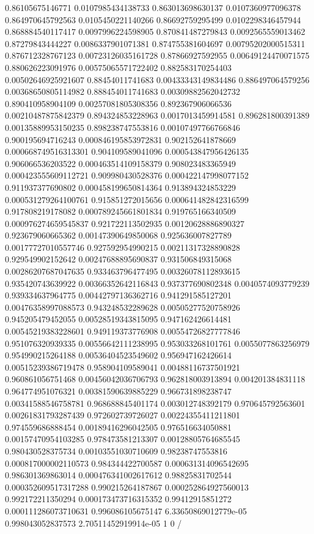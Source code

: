 \begin{table}
\begin{tabu}
\begin{sparkline}{10}
0.86105675146771 0.0107985434138733 0.863013698630137 0.0107360977096378 0.864970645792563 0.0105450221140266 0.86692759295499 0.0102298346457944 0.868884540117417 0.0097996224598905 0.870841487279843 0.0092565559013462 0.87279843444227 0.0086337901071381 0.874755381604697 0.00795202000515311 0.876712328767123 0.00723126035161728 0.87866927592955 0.00649124470071575 0.880626223091976 0.00575065571722402 0.882583170254403 0.00502646925921607 0.88454011741683 0.00433343149834486 0.886497064579256 0.00368650805114982 0.888454011741683 0.00309882562042732 0.890410958904109 0.00257081805308356 0.892367906066536 0.00210487875842379 0.894324853228963 0.0017013459914581 0.896281800391389 0.00135889953150235 0.898238747553816 0.00107497766766846 0.900195694716243 0.000846195853972831 0.902152641878669 0.000668749516313301 0.904109589041096 0.000543847956426135 0.906066536203522 0.000463514109158379 0.908023483365949 0.000423555609112721 0.909980430528376 0.000422147998077152 0.911937377690802 0.000458199650814364 0.913894324853229 0.000531279264100761 0.915851272015656 0.000641482842316599 0.917808219178082 0.000789245661801834 0.919765166340509 0.000976274659545837 0.921722113502935 0.00120628886890327 0.923679060665362 0.00147390649850068 0.925636007827789 0.00177727010557746 0.927592954990215 0.00211317328890828 0.929549902152642 0.00247688895690837 0.931506849315068 0.00286207687047635 0.933463796477495 0.00326078112893615 0.935420743639922 0.00366352642116843 0.937377690802348 0.0040574093779239 0.939334637964775 0.00442797136362716 0.941291585127201 0.00476358997088573 0.943248532289628 0.00505277520758926 0.945205479452055 0.00528519343815095 0.947162426614481 0.00545219383228601 0.949119373776908 0.00554726827777846 0.951076320939335 0.00556642111238995 0.953033268101761 0.0055077863256979 0.954990215264188 0.00536404523549602 0.956947162426614 0.00515239386719478 0.958904109589041 0.00488116737501921 0.960861056751468 0.00456042036706793 0.962818003913894 0.004201384831118 0.964774951076321 0.00381590639885229 0.966731898238747 0.00341588546758781 0.968688845401174 0.003012748392179 0.970645792563601 0.00261831793287439 0.972602739726027 0.00224355411211801 0.974559686888454 0.00189416296042505 0.976516634050881 0.00157470954103285 0.978473581213307 0.00128805764685545 0.980430528375734 0.00103551030710609 0.98238747553816 0.000817000002110573 0.984344422700587 0.000631314096542695 0.986301369863014 0.000476341002617612 0.98825831702544 0.000352609517317288 0.990215264187867 0.000252864927560013 0.992172211350294 0.000173473716315352 0.99412915851272 0.000111286073710631 0.996086105675147 6.33650869012779e-05 0.998043052837573 2.70511452919914e-05 1 0 /

\end{sparkline}
\end{tabu}
\end{table}

